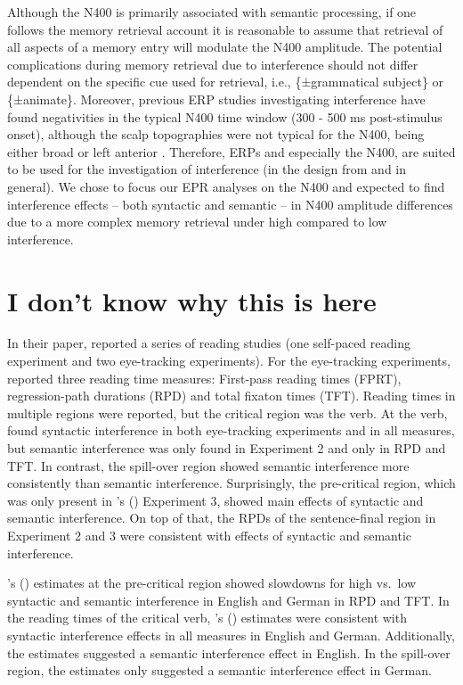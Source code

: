 \documentclass[a4paper, man, floatsintext]{apa7}
\begin{document}
Although the N400 is primarily associated with semantic processing, if one follows the memory retrieval account it is reasonable to assume that retrieval of all aspects of a memory entry will modulate the N400 amplitude. The potential complications during memory retrieval due to interference should not differ dependent on the specific cue used for retrieval, i.e., \{±grammatical subject\} or \{±animate\}.  Moreover, previous ERP studies investigating interference have found negativities in the typical N400 time window (300 - 500 ms post-stimulus onset), although the scalp topographies were not typical for the N400, being either broad \citep{schoknecht2022} or left anterior \citep{vasishth_drenhaus_2011}. Therefore, ERPs and especially the N400, are suited to be used for the investigation of interference (in the design from \citet{vandyke07} and in general).  We chose to focus our EPR analyses on the N400 and expected to find interference effects -- both syntactic and semantic -- in N400 amplitude differences due to a more complex memory retrieval under high compared to low interference. 



\section{I don't know why this is here}
In their \citeyear{vandyke07} paper, \citeauthor{vandyke07} reported a series of reading studies (one self-paced reading experiment and two eye-tracking experiments). For the eye-tracking experiments, \citet{vandyke07} reported three reading time measures: First-pass reading times (FPRT), regression-path durations (RPD) and total fixaton times (TFT). Reading times in multiple regions were reported, but the critical region was the verb. At the verb, \citet{vandyke07} found syntactic interference in both eye-tracking experiments and in all measures, but semantic interference was only found in Experiment 2 and only in RPD and TFT. In contrast, the spill-over region showed semantic interference more consistently than semantic interference. Surprisingly, the pre-critical region, which was only present in \citeauthor{vandyke07}'s (\citeyear{vandyke07}) Experiment 3, showed main effects of syntactic and semantic interference. On top of that, the RPDs of the sentence-final region in Experiment 2 and 3 were consistent with effects of syntactic and  semantic interference.

\citeauthor{mertzen}'s (\citeyear{mertzen}) estimates at the pre-critical region showed slowdowns for high vs.\ low  syntactic and semantic interference in English and German in RPD and TFT. In the reading times of the critical verb, \citeauthor{mertzen}'s (\citeyear{mertzen}) estimates were consistent with syntactic interference effects in all measures in English and German. Additionally, the estimates suggested a semantic interference effect in English. In the spill-over region, the estimates only suggested a semantic interference effect in German.
\end{document}
